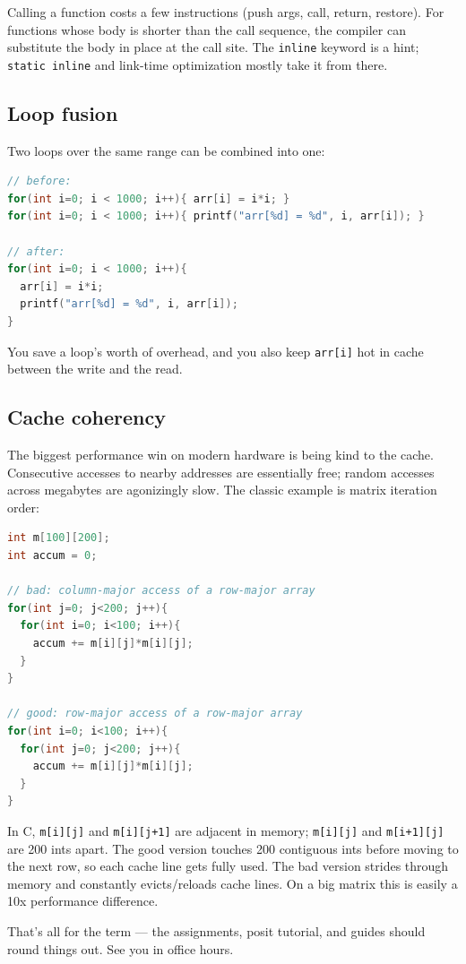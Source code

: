 \documentclass[11pt]{article}
\begin{document}
Calling a function costs a few instructions (push args, call,
return, restore). For functions whose body is shorter than the call
sequence, the compiler can substitute the body in place at the call
site. The \texttt{inline} keyword is a hint; \texttt{static inline}
and link-time optimization mostly take it from there.

\subsection*{Loop fusion}

Two loops over the same range can be combined into one:

\begin{lstlisting}[language=C]
// before:
for(int i=0; i < 1000; i++){ arr[i] = i*i; }
for(int i=0; i < 1000; i++){ printf("arr[%d] = %d", i, arr[i]); }

// after:
for(int i=0; i < 1000; i++){
  arr[i] = i*i;
  printf("arr[%d] = %d", i, arr[i]);
}
\end{lstlisting}

You save a loop's worth of overhead, and you also keep \texttt{arr[i]}
hot in cache between the write and the read.

\subsection*{Cache coherency}

The biggest performance win on modern hardware is being kind to the
cache. Consecutive accesses to nearby addresses are essentially free;
random accesses across megabytes are agonizingly slow. The classic
example is matrix iteration order:

\begin{lstlisting}[language=C]
int m[100][200];
int accum = 0;

// bad: column-major access of a row-major array
for(int j=0; j<200; j++){
  for(int i=0; i<100; i++){
    accum += m[i][j]*m[i][j];
  }
}

// good: row-major access of a row-major array
for(int i=0; i<100; i++){
  for(int j=0; j<200; j++){
    accum += m[i][j]*m[i][j];
  }
}
\end{lstlisting}

In C, \texttt{m[i][j]} and \texttt{m[i][j+1]} are adjacent in
memory; \texttt{m[i][j]} and \texttt{m[i+1][j]} are 200 ints apart.
The good version touches 200 contiguous ints before moving to the
next row, so each cache line gets fully used. The bad version
strides through memory and constantly evicts/reloads cache lines.
On a big matrix this is easily a 10x performance difference.

That's all for the term --- the assignments, posit tutorial, and
guides should round things out. See you in office hours.
\end{document}
